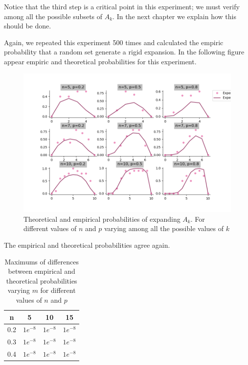Notice that the third step is a critical point in this experiment; we must verify among all the possible subsets of $A_{k}$. In the next chapter we explain how this should be done.

Again, we repeated this experiment 500 times and calculated the empiric probability that a random set generate a rigid expansion. In the following figure appear empiric and theoretical probabilities for this experiment.

\begin{figure}[h!]
	\centering
	\includegraphics[scale=0.55]{Python/Figures/Expansion-probability.png}
	\caption{Theoretical and empirical probabilities of expanding $A_{k}$. For different values of $n$ and $p$ varying among all the possible values of $k$}
\end{figure}

The empirical and theoretical probabilities agree again.
 \vspace{0.3cm}
\begin{table}[htbp]
\begin{center}
\bgroup
\def\arraystretch{1.5}
\begin{tabular}{|c|c|c|c|}
\hline
n & 5 & 10 & 15 \\
\hline
 0.2 & $1e^{-8}$ & $1e^{-8}$ & $1e^{-8}$ \\\hline
 0.3 & $1e^{-8}$ & $1e^{-8}$ & $1e^{-8}$ \\\hline
 0.4 & $1e^{-8}$ & $1e^{-8}$ & $1e^{-8}$ \\\hline
\end{tabular}
\egroup
\caption{Maximums of differences between empirical and theoretical probabilities varying $m$ for different values of $n$ and $p$}
\label{tabla:sencilla}
\end{center}
\end{table}
\vspace{-0.3cm}
 
